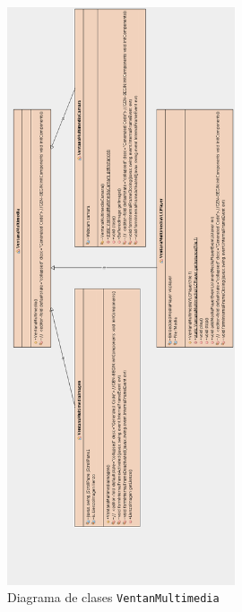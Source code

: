 \begin{figure}
 \centering
  \includegraphics[width=0.6\textwidth]{diagramas/ventanaMultimedia.png}
 \caption{Diagrama de clases \texttt{VentanMultimedia}}
 \label{diseño}
 \end{figure}

